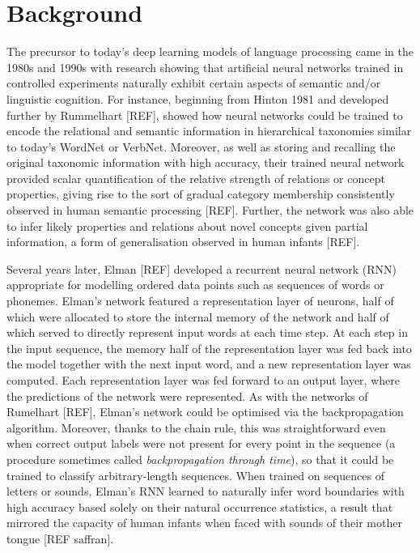 \documentclass[11pt,letterpaper]{article}
\begin{document}
\section{Background}

The precursor to today's deep learning models of language processing came in the 1980s and 1990s with research showing that artificial neural networks trained in controlled experiments naturally exhibit certain aspects of semantic and/or linguistic cognition. For instance, beginning from Hinton 1981 and developed further by Rummelhart [REF], showed how neural networks could be trained to encode the relational and semantic information in hierarchical taxonomies similar to today's WordNet or VerbNet. Moreover, as well as storing and recalling the original taxonomic information with high accuracy, their trained neural network provided scalar quantification of the relative strength of relations or concept properties, giving rise to the sort of gradual category membership consistently observed in human semantic processing [REF]. Further, the network was also able to infer likely properties and relations about novel concepts given partial information, a form of generalisation observed in human infants [REF]. 

Several years later, Elman [REF] developed a recurrent neural network (RNN) appropriate for modelling ordered data points such as sequences of words or phonemes. Elman's network featured a representation layer of neurons, half of which were allocated to store the internal memory of the network and half of which served to directly represent input words at each time step. At each step in the input sequence, the memory half of the representation layer was fed back into the model together with the next input word, and a new representation layer was computed. Each representation layer was fed forward to an output layer, where the predictions of the network were represented. As with the networks of Rumelhart [REF], Elman's network could be optimised via the backpropagation algorithm. Moreover, thanks to the chain rule, this was straightforward even when correct output labels were not present for every point in the sequence (a procedure sometimes called \emph{backpropagation through time}), so that it could be trained to classify arbitrary-length sequences. When trained on sequences of letters or sounds, Elman's RNN learned to naturally infer word boundaries with high accuracy based solely on their natural occurrence statistics, a result that mirrored the capacity of human infants when faced with sounds of their mother tongue [REF saffran]. 
\end{document}
